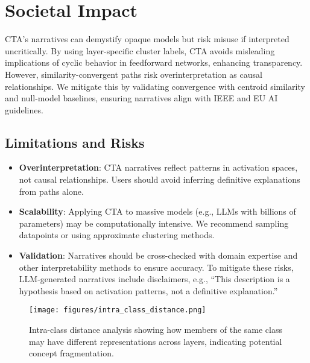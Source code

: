 \section{Societal Impact}

CTA's narratives can demystify opaque models but risk misuse if interpreted uncritically. By using layer-specific cluster labels, CTA avoids misleading implications of cyclic behavior in feedforward networks, enhancing transparency. However, similarity-convergent paths risk overinterpretation as causal relationships. We mitigate this by validating convergence with centroid similarity and null-model baselines, ensuring narratives align with IEEE and EU AI guidelines.

\subsection{Limitations and Risks}

\begin{itemize}
    \item \textbf{Overinterpretation}: CTA narratives reflect patterns in activation spaces, not causal relationships. Users should avoid inferring definitive explanations from paths alone.
    \item \textbf{Scalability}: Applying CTA to massive models (e.g., LLMs with billions of parameters) may be computationally intensive. We recommend sampling datapoints or using approximate clustering methods.
    \item \textbf{Validation}: Narratives should be cross-checked with domain expertise and other interpretability methods to ensure accuracy. To mitigate these risks, LLM-generated narratives include disclaimers, e.g., ``This description is a hypothesis based on activation patterns, not a definitive explanation.''
\end{itemize}

\begin{figure}[ht]
    \centering
    \texttt{[image: figures/intra\_class\_distance.png]}
    \caption{Intra-class distance analysis showing how members of the same class may have different representations across layers, indicating potential concept fragmentation.}
    \label{fig:intra_class_distance}
\end{figure}